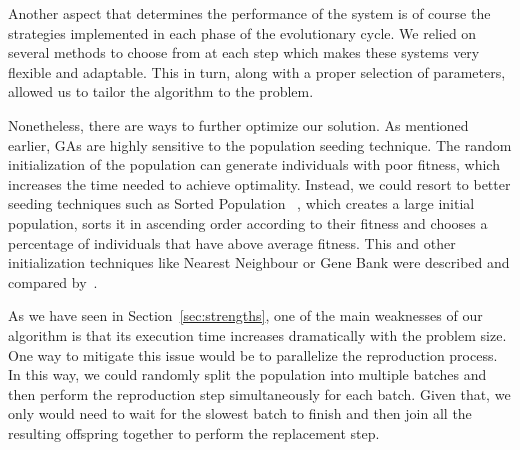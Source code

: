 \documentclass[anon]{CI}
\begin{document}
Another aspect that determines the performance of the system is of course the strategies implemented in each phase of the evolutionary cycle. We relied on several methods to choose from at each step which makes these systems very flexible and adaptable. This in turn, along with a proper selection of parameters, allowed us to tailor the algorithm to the problem.

Nonetheless, there are ways to further optimize our solution. As mentioned earlier, GAs are highly sensitive to the population seeding technique. The random initialization of the population can generate individuals with poor fitness, which increases the time needed to achieve optimality. Instead, we could resort to better seeding techniques such as Sorted Population ~\cite{yugay2008hybrid}, which creates a large initial population, sorts it in ascending order according to their fitness and chooses a percentage of individuals that have above average fitness. This and other initialization techniques like Nearest Neighbour or Gene Bank were described and compared by~\cite{hassanat2018improved}.

As we have seen in Section~\ref{sec:strengths}, one of the main weaknesses of our algorithm is that its execution time increases dramatically with the problem size. One way to mitigate this issue would be to parallelize the reproduction process. In this way, we could randomly split the population into multiple batches and then perform the reproduction step simultaneously for each batch. Given that, we only would need to wait for the slowest batch to finish and then join all the resulting offspring together to perform the replacement step.


\clearpage


\end{document}
